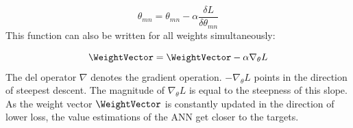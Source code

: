 \begin{equation} \label{eq: individual weight update}
    \theta_{mn} = \theta_{mn} - \alpha \frac{\delta L}{\delta \theta_{mn}}
\end{equation}
This function can also be written for all weights simultaneously:


\begin{equation}
    \WeightVector = \WeightVector  - \alpha \nabla_{\theta} L
\end{equation}
The del operator $\nabla$ denotes the gradient operation. $-\nabla_{\theta} L$ points in the direction of steepest descent. The magnitude of $\nabla_{\theta} L$ is equal to the steepness of this slope. As the weight vector $\WeightVector$ is constantly updated in the direction of lower loss, the value estimations of the ANN get closer to the targets.

















